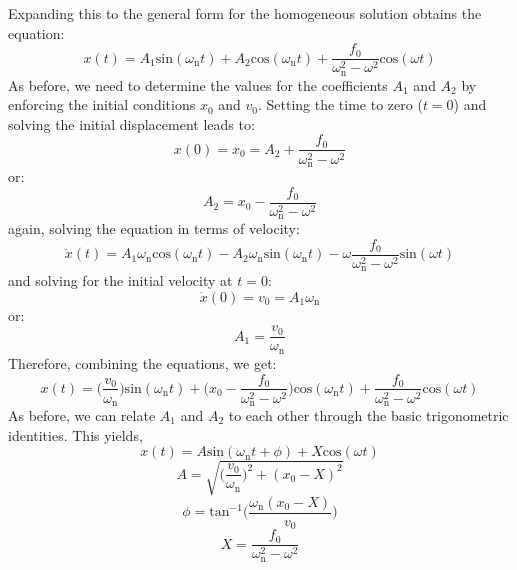 \documentclass[12pt,letter]{article}
\begin{document}
 Expanding this to the general form for the homogeneous solution obtains the equation:
 \begin{equation}
  x(t) = A_1\text{sin}(\omega_\text{n} t) + A_2\text{cos}(\omega_\text{n} t) + \frac{f_0}{\omega_\text{n}^2-\omega^2}\text{cos}(\omega t)
 \end{equation}    
 As before, we need to determine the values for the coefficients $A_1$ and $A_2$ by enforcing the initial conditions $x_0$ and $v_0$. Setting the time to zero ($t=0$) and solving the initial displacement leads to:
 \begin{equation}
  x(0) = x_0 = A_2 + \frac{f_0}{\omega_\text{n}^2-\omega^2}
 \end{equation}    
 or:
 \begin{equation}
  A_2 = x_0-\frac{f_0}{\omega_\text{n}^2-\omega^2}
 \end{equation} 
 again, solving the equation in terms of velocity:
 \begin{equation}
  \dot{x}(t) = A_1\omega_\text{n}\text{cos}(\omega_\text{n} t) - A_2 \omega_\text{n} \text{sin}(\omega_\text{n} t) - \omega \frac{f_0}{\omega_\text{n}^2-\omega^2}\text{sin}(\omega t)
 \end{equation} 
 and solving for the initial velocity at $t=0$:
 \begin{equation}
  \dot{x}(0) = v_0 =  A_1 \omega_\text{n}
 \end{equation}    
 or:
 \begin{equation}
  A_1 = \frac{v_0}{\omega_\text{n}}
 \end{equation}    
 Therefore, combining the equations, we get:
 \begin{equation}
  x(t) = \Big(\frac{v_0}{\omega_\text{n}}\Big)\text{sin}(\omega_\text{n} t) + \Big(x_0-\frac{f_0}{\omega_\text{n}^2-\omega^2}\Big)\text{cos}(\omega_\text{n} t) + \frac{f_0}{\omega_\text{n}^2-\omega^2}\text{cos}(\omega t)
 \end{equation} 
 As before, we can relate $A_1$ and $A_2$ to each other through the basic trigonometric identities. This yields, 
 \begin{equation}
  x(t) = A\text{sin}(\omega_\text{n} t + \phi) + X\text{cos}(\omega t) 
 \end{equation}    
 \begin{equation}
  A = \sqrt{\bigg(\frac{v_0}{\omega_\text{n}}\bigg)^2+(x_0-X)^2}
 \end{equation}    
 \begin{equation}
  \phi = \text{tan}^{-1}\bigg(\frac{\omega_\text{n}(x_0-X)}{v_0}\bigg)
 \end{equation}    
 \begin{equation}
  X = \frac{f_0}{\omega_\text{n}^2-\omega^2}
 \end{equation}    
 
\end{document}
